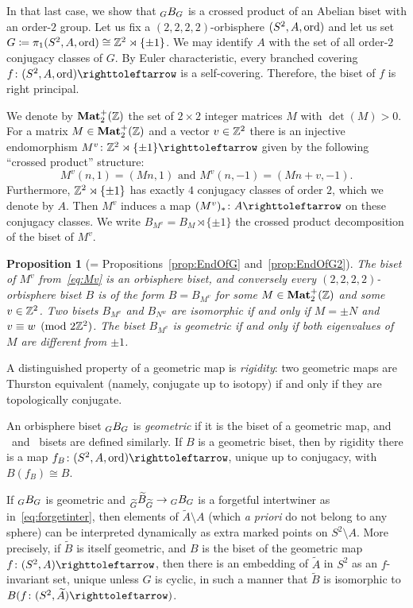 \documentclass{amsart}
\newcommand\wtA{{\widetilde A}}
\newcommand\wtB{{\widetilde B}}
\newcommand\wtG{{\widetilde G}}
\newtheorem{mainprop}[mainthm]{Proposition}
\begin{document}
In that last case, we show that $\subscript G B_G$ is a crossed
product of an Abelian biset with an order-$2$ group.  Let us fix a
$(2,2,2,2)$-orbisphere $(S^2,A, \operatorname{ord})$ and let us set
$G\coloneqq \pi_1(S^2,A, \operatorname{ord})\cong{\mathbb Z}^2\rtimes\{\pm1\}$. We may
identify $A$ with the set of all order-$2$ conjugacy classes of
$G$. By Euler characteristic, every branched covering
$f\colon (S^2,A, \ord) \selfmap$ is a self-covering. Therefore, the
biset of $f$ is right principal.

We denote by $\mathbf{Mat}_2^+({\mathbb Z})$ the set of $2\times2$ integer matrices $M$
with $\det(M)>0$. For a matrix $M\in \mathbf{Mat}^+_2({\mathbb Z})$ and a vector
$v\in {\mathbb Z}^2$ there is an injective endomorphism
$M^v\colon \Z^2\rtimes\{\pm1\}\selfmap$ given by the following
``crossed product'' structure:
\begin{equation}\label{eq:Mv}
  M^{v}(n,1)=(M n,1) \text{ and }M^{v}(n,-1)=(M n+v,-1).
\end{equation}
Furthermore, ${\mathbb Z}^2\rtimes\{\pm1\}$ has exactly $4$ conjugacy classes
of order $2$, which we denote by $A$. Then $M^v$ induces a map
$(M^v)_*\colon A \selfmap$ on these conjugacy classes. We write
$B_{M^v}=B_M\rtimes\{\pm1\}$ the crossed product decomposition of the
biset of $M^v$.

\begin{mainprop}[= Propositions~\ref{prop:EndOfG} and~\ref{prop:EndOfG2}]
  The biset of $M^v$ from~\eqref{eq:Mv} is an orbisphere biset, and
  conversely every $(2,2,2,2)$-orbisphere biset $B$ is of the form
  $B=B_{M^v}$ for some $M\in\mathbf{Mat}^+_2({\mathbb Z})$ and some $v\in{\mathbb Z}^2$. Two
  bisets $B_{M^v}$ and $B_{N^w}$ are isomorphic if and only if
  $M=\pm N$ and $v\equiv w\pmod{2{\mathbb Z}^2}$.  The biset $B_{M^{v}}$ is
  geometric if and only if both eigenvalues of $M$ are different from
  $\pm 1$.
\end{mainprop}

A distinguished property of a geometric map is \emph{rigidity}: two
geometric maps are Thurston equivalent (namely, conjugate up to
isotopy) if and only if they are topologically conjugate.

An orbisphere biset $\subscript G B_{G}$ is \emph{geometric} if it is
the biset of a geometric map, and \Tor\ and \Exp\ bisets are defined
similarly. If $B$ is a geometric biset, then by rigidity there is a
map $f_B\colon (S^2,A,\ord)\selfmap$, unique up to conjugacy, with
$B(f_B)\cong B$.

If $\subscript G B_G$ is geometric and
$\subscript\wtG{\wtB}_{\wtG}\to\subscript G
B_G$ is a forgetful intertwiner as in~\eqref{eq:forgetinter}, then
elements of $\wtA\setminus A$ (which \emph{a priori} do not
belong to any sphere) can be interpreted dynamically as extra marked
points on $S^2\setminus A$. More precisely, if $\wtB$ is
itself geometric, and $B$ is the biset of the geometric map
$f\colon(S^2,A)\selfmap$, then there is an embedding of $\wtA$
in $S^2$ as an $f$-invariant set, unique unless $G$ is cyclic, in such
a manner that $\wtB$ is isomorphic to
$B(f\colon(S^2,\wtA)\selfmap)$.
\end{document}
